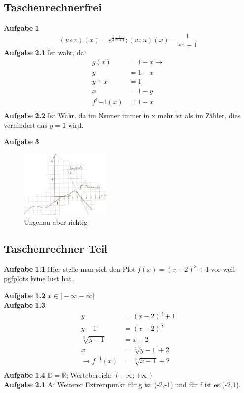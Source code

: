 \documentclass{report}
\begin{document}
\subsection*{Taschenrechnerfrei}
\textbf{Aufgabe 1}
\[(u\circ v)(x)=e^{\frac{1}{2}\frac{1}{x^2+1}} ; (v\circ u)(x)=\frac{1}{e^x+1} \]
\textbf{Aufgabe 2.1}
Ist wahr, da:
\begin{align*}
    g(x) & =1-x  \to\\
        y &= 1-x\\
        y+x & = 1\\
        x & = 1-y\\
        f^1{-1}(x) & =1-x\\
\end{align*}
\textbf{Aufgabe 2.2}
Ist Wahr, da im Nenner immer in x mehr ist als im Zähler, dies verhindert das $y=1$ wird.

\noindent\textbf{Aufgabe 3}
\begin{figure}[htpb]
    \centering
    \includegraphics[width=0.4\textwidth]{math-figures/ka-1-3a.png}
    \caption{Ungenau aber richtig}
\end{figure}
\subsection*{Taschenrechner Teil}
\textbf{Aufgabe 1.1}
Hier stelle man sich den Plot $f(x)=(x-2)^3+1$ vor weil pgfplots keine lust hat.

\noindent \textbf{Aufgabe 1.2} $x \in ]-\infty-\infty[$\\
\noindent \textbf{Aufgabe 1.3}
\begin{align*}
   y&= (x-2)^3+1 \\ 
   y-1&= (x-2)^3 \\
   \sqrt[3]{y-1}&= x-2 \\ 
   x&=\sqrt[3]{y-1}+2 \\
   \to f^{-1}(x)&= \sqrt[3]{x-1}+2\\
\end{align*}
\textbf{Aufgabe 1.4} $\mathbb{D}=\mathbb{R}$; Wertebereich: $(-\infty;+\infty)$\\
\textbf{Aufgabe 2.1} 
A: Weiterer Extrempunkt für g ist (-2,-1) und für f ist es (-2,1).
\end{document}
